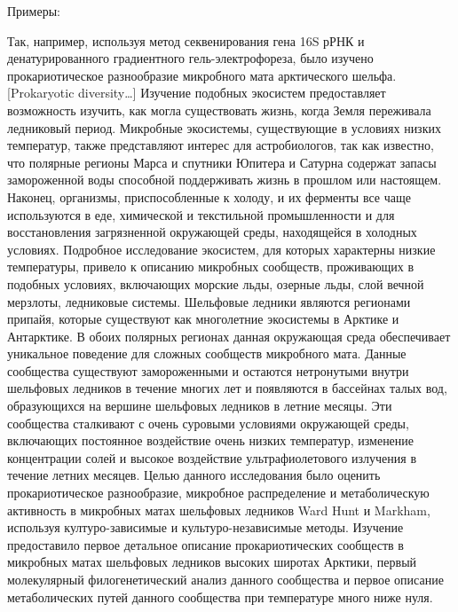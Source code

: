 Примеры:

Так, например, используя метод секвенирования гена 16S рРНК и денатурированного градиентного гель-электрофореза, было изучено прокариотическое разнообразие микробного мата арктического шельфа. [Prokaryotic diversity…] Изучение подобных экосистем предоставляет возможность изучить, как могла существовать жизнь, когда Земля переживала ледниковый период. Микробные экосистемы, существующие в условиях низких температур, также представляют интерес для астробиологов, так как известно, что полярные регионы Марса и спутники Юпитера и Сатурна содержат запасы замороженной воды способной поддерживать жизнь в прошлом или настоящем. Наконец, организмы, приспособленные к холоду,  и их ферменты все чаще используются в еде, химической и текстильной промышленности и для восстановления загрязненной окружающей среды, находящейся в холодных условиях. Подробное исследование экосистем, для которых характерны низкие температуры, привело к описанию микробных сообществ, проживающих в подобных условиях, включающих морские льды, озерные льды, слой вечной мерзлоты, ледниковые системы. Шельфовые ледники являются регионами припайя, которые существуют как многолетние экосистемы в Арктике и Антарктике. В обоих полярных регионах данная окружающая среда обеспечивает уникальное поведение для сложных сообществ микробного мата. Данные сообщества существуют замороженными и остаются нетронутыми внутри шельфовых ледников в течение многих лет и появляются в бассейнах талых вод, образующихся на вершине  шельфовых ледников в летние месяцы. Эти сообщества сталкивают с очень суровыми условиями окружающей среды, включающих постоянное воздействие очень низких температур, изменение концентрации солей и высокое воздействие ультрафиолетового излучения в течение летних месяцев. Целью данного исследования было оценить прокариотическое разнообразие, микробное распределение и метаболическую активность в микробных матах шельфовых ледников Ward Hunt и Markham, используя културо-зависимые и культуро-независимые методы. Изучение предоставило первое детальное описание прокариотических сообществ в микробных матах шельфовых ледников высоких широтах Арктики, первый молекулярный филогенетический анализ данного сообщества и первое описание метаболических путей данного сообщества при температуре много ниже нуля. 

